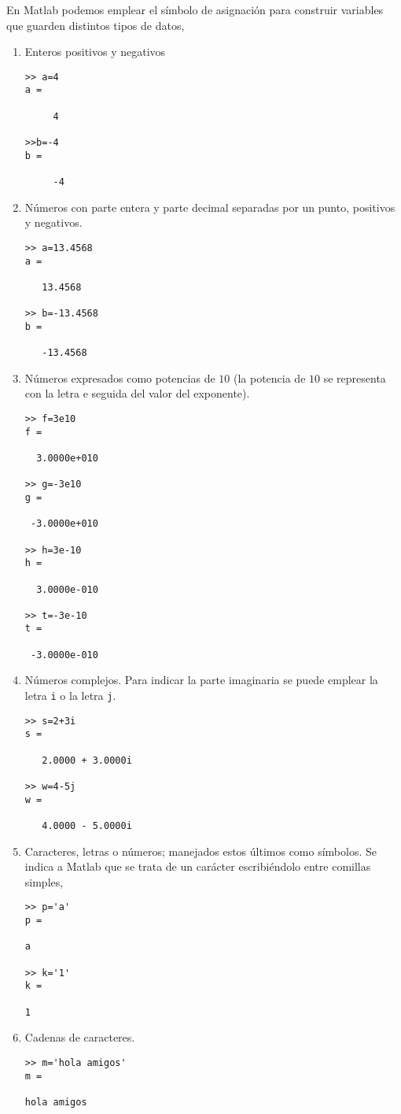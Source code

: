 En Matlab podemos emplear el símbolo de asignación para construir variables que guarden distintos tipos de datos,

\begin{enumerate}
\item Enteros positivos y negativos
\begin{verbatim}
>> a=4
a =

     4

>>b=-4
b =

     -4

\end{verbatim}
\item Números con parte entera y parte decimal separadas por un punto, positivos y negativos.
\begin{verbatim}
>> a=13.4568
a =

   13.4568

>> b=-13.4568
b =

   -13.4568
\end{verbatim}


\item Números expresados como potencias de $10$ (la potencia de $10$ se representa con la letra e seguida del valor del exponente). 
\begin{verbatim}
>> f=3e10
f =

  3.0000e+010

>> g=-3e10
g =

 -3.0000e+010

>> h=3e-10
h =

  3.0000e-010

>> t=-3e-10
t =

 -3.0000e-010
 \end{verbatim}
 
\item Números complejos. Para indicar la parte imaginaria se puede emplear la letra \texttt{i} o la letra \texttt{j}.

\begin{verbatim}
>> s=2+3i
s =

   2.0000 + 3.0000i

>> w=4-5j
w =

   4.0000 - 5.0000i
\end{verbatim}

\item Caracteres, letras o números; manejados estos últimos como símbolos. Se indica a Matlab que se trata de un carácter escribiéndolo entre comillas simples,
\begin{verbatim}
>> p='a'
p =

a

>> k='1'
k =

1
\end{verbatim}

\item Cadenas de caracteres. 
\begin{verbatim}
>> m='hola amigos'
m =

hola amigos
\end{verbatim}

\end{enumerate}
